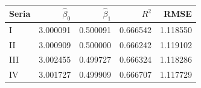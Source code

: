 \begin{tabular}{lrrrr}
\toprule
Seria & $\hat\beta_0$ & $\hat\beta_1$ & $R^2$ & RMSE \\
\midrule
I & \num{3.000091} & \num{0.500091} & \num{0.666542} & \num{1.118550} \\
II & \num{3.000909} & \num{0.500000} & \num{0.666242} & \num{1.119102} \\
III & \num{3.002455} & \num{0.499727} & \num{0.666324} & \num{1.118286} \\
IV & \num{3.001727} & \num{0.499909} & \num{0.666707} & \num{1.117729} \\
\bottomrule
\end{tabular}
